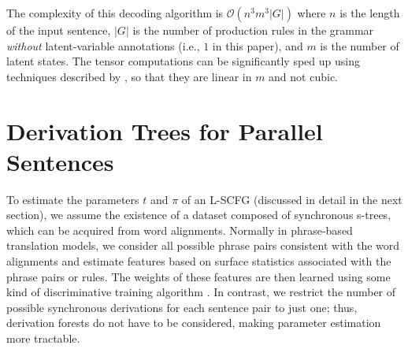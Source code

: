 \documentclass[11pt]{article}
\newcommand{\cjd}[1]{\textcolor{red}{\textbf{[#1 --CJD] }}}
\newcommand{\shaycomment}[1]{\textcolor{blue}{#1 -- Shay}}
\newcommand{\avcomment}[1]{\textcolor{orange}{\textbf{[#1 -- Av]}}}
\begin{document}
The complexity of this decoding algorithm is $\mathcal{O}(n^3 m^3 |G|)$ where $n$ is the length of the input sentence, $|G|$ is the number of production rules in the grammar \emph{without} latent-variable annotations (i.e., $1$ in this paper), and $m$ is the number of latent states.
The tensor computations can be significantly
sped up using techniques described by , so that they are linear in $m$ and not cubic.  



\section{Derivation Trees for Parallel Sentences}
\label{sec:mingrammar}
To estimate the parameters $t$ and $\pi$ of an L-SCFG (discussed in detail in the next section), we assume the existence of a dataset composed of synchronous s-trees, which can be acquired from word alignments.  
Normally in phrase-based translation models, we consider all possible phrase pairs consistent with the word alignments and estimate features based on surface statistics associated with the phrase pairs or rules. 
The weights of these features are then learned using some kind of discriminative training algorithm \cite{Och2003,Chiang2012}.  
In contrast, we restrict the number of possible synchronous derivations for each sentence pair to just one; thus, derivation forests do not have to be considered, making parameter estimation more tractable.  
\end{document}
